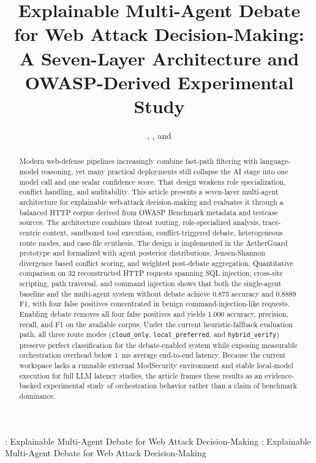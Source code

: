 \documentclass{ieeeaccess}
\newcommand{\sys}{AetherGuard}
\begin{document}
\history{}
\doi{}

\title{Explainable Multi-Agent Debate for Web Attack Decision-Making: A Seven-Layer Architecture and OWASP-Derived Experimental Study}
\author{\uppercase{\AuthorOneName},
\uppercase{\AuthorTwoName},
and \uppercase{\AuthorThreeName}}

\address[1]{\AffiliationOneText\ (e-mail: \AffiliationOneEmails)}
\address[2]{\AffiliationTwoText\ (e-mail: \AffiliationTwoEmails)}
\tfootnote{\MetadataFootnoteText}

\markboth
{\RunningAuthorText: Explainable Multi-Agent Debate for Web Attack Decision-Making}
{\RunningAuthorText: Explainable Multi-Agent Debate for Web Attack Decision-Making}

\corresp{\CorrespondingAuthorLine}

\begin{abstract}
Modern web-defense pipelines increasingly combine fast-path filtering with language-model reasoning, yet many practical deployments still collapse the AI stage into one model call and one scalar confidence score. That design weakens role specialization, conflict handling, and auditability. This article presents a seven-layer multi-agent architecture for explainable web-attack decision-making and evaluates it through a balanced HTTP corpus derived from OWASP Benchmark metadata and testcase sources. The architecture combines threat routing, role-specialized analysis, trace-centric context, sandboxed tool execution, conflict-triggered debate, heterogeneous route modes, and case-file synthesis. The design is implemented in the \sys{} prototype and formalized with agent posterior distributions, Jensen-Shannon divergence based conflict scoring, and weighted post-debate aggregation. Quantitative comparison on 32 reconstructed HTTP requests spanning SQL injection, cross-site scripting, path traversal, and command injection shows that both the single-agent baseline and the multi-agent system without debate achieve 0.875 accuracy and 0.8889 F1, with four false positives concentrated in benign command-injection-like requests. Enabling debate removes all four false positives and yields 1.000 accuracy, precision, recall, and F1 on the available corpus. Under the current heuristic-fallback evaluation path, all three route modes (\texttt{cloud\_only}, \texttt{local\_preferred}, and \texttt{hybrid\_verify}) preserve perfect classification for the debate-enabled system while exposing measurable orchestration overhead below 1~ms average end-to-end latency. Because the current workspace lacks a runnable external ModSecurity environment and stable local-model execution for full LLM latency studies, the article frames these results as an evidence-backed experimental study of orchestration behavior rather than a claim of benchmark dominance.
\end{abstract}
\end{document}

